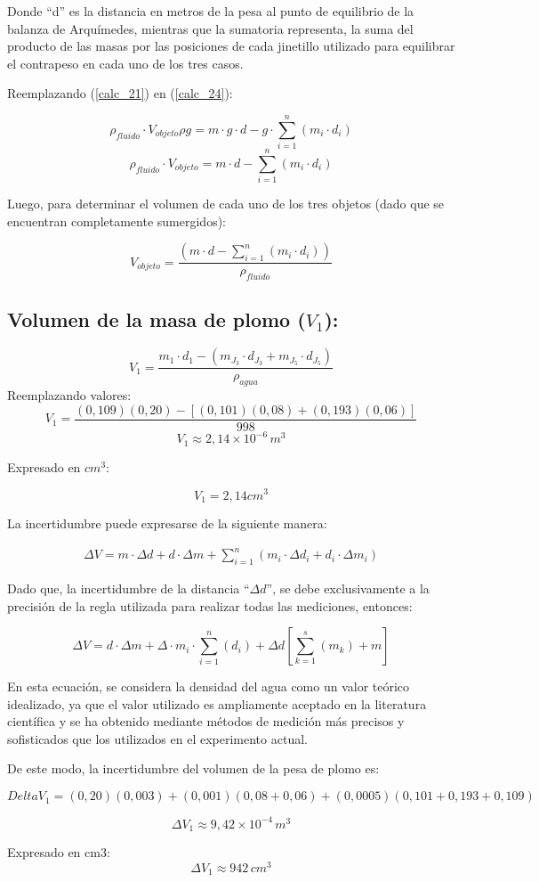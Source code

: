 \documentclass[../main.tex]{subfiles}
\begin{document}
Donde “d” es la distancia en metros de la pesa al punto de
equilibrio de la balanza de Arquímedes, mientras que la 
sumatoria representa, la suma del producto de las masas por 
las posiciones de cada jinetillo utilizado para equilibrar el 
contrapeso en cada uno de los tres casos.

Reemplazando (\ref{calc_21}) en (\ref{calc_24}):

\[\rho_{fluido}\cdot V_{objeto}\rho g=m\cdot g\cdot d-g\cdot\sum_{i=1}^n (m_i\cdot d_i ) \]
\[\rho_{fluido}\cdot V_{objeto}=m\cdot d-\sum_{i=1}^n (m_i\cdot d_i ) \]

Luego, para determinar el volumen de cada uno de los tres objetos (dado que se encuentran completamente sumergidos):

\begin{equation} \label{calc_25}
    V_{objeto}=\frac{(m\cdot d -\sum_{i=1}^n (m_i\cdot d_i ) )}{\rho_{fluido}} 
\end{equation}

\subsection{Volumen de la masa de plomo ($V_1$):}

\[V_1=\frac{m_1\cdot d_1- (m_J_3 \cdot d_J_3+m_J_5 \cdot d_J_5 )}{\rho_{agua}} \]
Reemplazando valores:
\[V_1=\frac{(0,109)(0,20)-[(0,101)(0,08)+(0,193)(0,06)]}{998}\]
\[V_1\approx2,14\times10^{-6}\,  m^3 \]

Expresado en $cm^3$:

\[V_1=2,14cm^3\]

La incertidumbre puede expresarse de la siguiente manera:

\begin{align} \nonumber
    \Delta V=m\cdot\Delta d+d\cdot\Delta m+\sum_{i=1}^n (m_i \cdot\Delta d_i+d_i \cdot\Delta m_i ) 
\end{align}

Dado que, la incertidumbre de la distancia “$\Delta d$”, se debe exclusivamente a la precisión de la
regla utilizada para realizar todas las mediciones, entonces:

\begin{equation} \label{calc_26}
    \Delta V=d\cdot\Delta m+\Delta\cdot m_i \cdot \sum_{i=1}^n (d_i ) +\Delta d\left[\sum_{k=1}^s(m_k ) +m\right]
\end{equation}

En esta ecuación, se considera la densidad del agua como un valor teórico idealizado, ya que el valor utilizado es ampliamente aceptado en la literatura científica y se ha obtenido mediante métodos de medición más precisos y sofisticados que los utilizados en el experimento actual.

De este modo, la incertidumbre del volumen de la pesa de plomo es:

\[Delta V_1=(0,20)(0,003)+(0,001)(0,08+0,06)+(0,0005)(0,101+0,193+0,109)\]

\[\Delta V_1\approx9,42\times 10^{-4} \, m^3\]

Expresado en cm3:
\[\Delta V_1\approx942 \, cm^3\]
\end{document}

